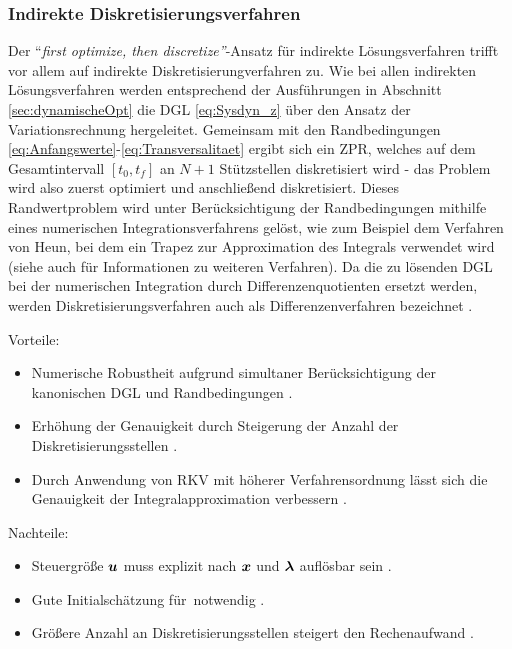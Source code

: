 \subsubsection{Indirekte Diskretisierungsverfahren}\label{subsubsec:Diskretisierungsverfahren_indirekt}
Der ``\textit{first optimize, then discretize''}-Ansatz für indirekte Lösungsverfahren trifft vor allem auf indirekte Diskretisierungverfahren zu. Wie bei allen indirekten Lösungsverfahren werden entsprechend der Ausführungen in Abschnitt \ref{sec:dynamischeOpt} die \gls{DGL} \eqref{eq:Sysdyn_z} über den Ansatz der Variationsrechnung hergeleitet. Gemeinsam mit den Randbedingungen \eqref{eq:Anfangswerte}-\eqref{eq:Transversalitaet} ergibt sich ein \gls{ZPR}, welches auf dem Gesamtintervall $[t_0, t_f]$ an $N+1$ Stützstellen diskretisiert wird \cite{KnutGraichen.2012} - das Problem wird also zuerst optimiert und anschließend diskretisiert. Dieses Randwertproblem wird unter Berücksichtigung der Randbedingungen mithilfe eines numerischen Integrationsverfahrens gelöst, wie zum Beispiel dem Verfahren von Heun, bei dem ein Trapez zur Approximation des Integrals verwendet wird \cite{KnutGraichen.2012} (siehe auch \cite{Adamy.2009} für Informationen zu weiteren Verfahren). Da die zu lösenden \gls{DGL} bei der numerischen Integration durch Differenzenquotienten ersetzt werden, werden Diskretisierungsverfahren auch als Differenzenverfahren bezeichnet \cite{Ascher.1995c5}.
\begin{multicols}{2}
Vorteile:
	\begin{itemize}
		\item Numerische Robustheit aufgrund simultaner Berücksichtigung der kanonischen \gls{DGL} und Randbedingungen \cite{KnutGraichen.2012}.
		\item Erhöhung der Genauigkeit durch Steigerung der Anzahl der Diskretisierungsstellen \cite{KnutGraichen.2012}.
		\item Durch Anwendung von \gls{RKV} mit höherer Verfahrensordnung lässt sich die Genauigkeit der Integralapproximation verbessern \cite{Ascher.1995c5}.
	\end{itemize}
	
	\columnbreak
	
Nachteile:
	\begin{itemize}
		\item Steuergröße $\boldsymbol{u}$ muss explizit nach $\boldsymbol{x}$ und $\boldsymbol{\lambda}$ auflösbar sein \cite{KnutGraichen.2012}.\vspace{\fill}
		\item Gute Initialschätzung für \lambdaoftzero\,notwendig \cite{KnutGraichen.2012}.\vspace{\fill}
		\item Größere Anzahl an Diskretisierungsstellen steigert den Rechenaufwand \cite{KnutGraichen.2012}.\vspace{\fill}
	\end{itemize}
\end{multicols}

